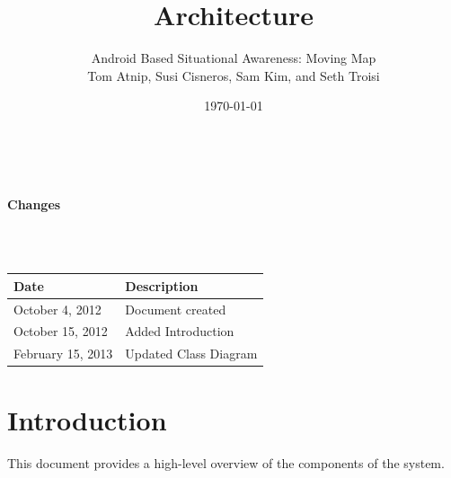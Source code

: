 \documentclass{article}
\begin{document}
\setlength{\voffset}{3.5in}
\title{Architecture}
\author{\Large Android Based Situational Awareness: Moving Map\\
Tom Atnip, Susi Cisneros, Sam Kim, and Seth Troisi}
\date{\today}
\maketitle
\clearpage
\setlength{\voffset}{0pt}
\tableofcontents
\clearpage
~\\
\begin{Large}\textbf{Changes}\end{Large}\\
~\\
\begin{tabular}{ | p{1.5in} | p{4.5in} | }
\hline
\textbf{Date} & \textbf{Description}\\
\hline
\hline
October 4, 2012 & Document created\\
\hline
October 15, 2012 & Added Introduction\\
\hline
February 15, 2013 & Updated Class Diagram\\
\hline
\end{tabular}
\clearpage

\section{Introduction}
This document provides a high-level overview of the components of the system.
\end{document}
